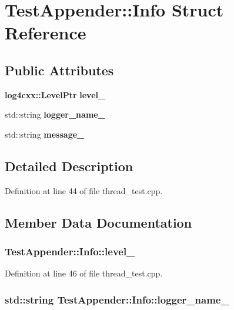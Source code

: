 \section{TestAppender::Info Struct Reference}
\label{structTestAppender_1_1Info}
\subsection*{Public Attributes}
\begin{DoxyCompactItemize}
\item 
{\bf log4cxx::LevelPtr} {\bf level\_\-}
\item 
std::string {\bf logger\_\-name\_\-}
\item 
std::string {\bf message\_\-}
\end{DoxyCompactItemize}


\subsection{Detailed Description}


Definition at line 44 of file thread\_\-test.cpp.



\subsection{Member Data Documentation}
\subsubsection[{level\_\-}]{ {\bf TestAppender::Info::level\_\-}}\label{structTestAppender_1_1Info_aa975a9e0bef1cacc49022927deaebeb9}


Definition at line 46 of file thread\_\-test.cpp.

\subsubsection[{logger\_\-name\_\-}]{\setlength{\rightskip}{0pt plus 5cm}std::string {\bf TestAppender::Info::logger\_\-name\_\-}}\label{structTestAppender_1_1Info_ab816344f7cb3b6596f06e21f2d0f238d}


